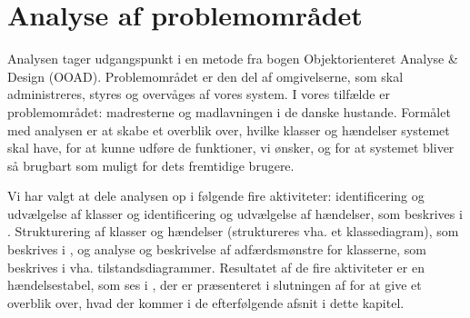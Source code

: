 \chapter{Analyse af problemområdet}
\label{chap:analyseafpo}

Analysen tager udgangspunkt i en metode fra bogen Objektorienteret Analyse \& Design (OOAD)\cite[s. ~43]{ooad}. Problemområdet er den del af omgivelserne, som skal administreres, styres og overvåges af vores system. I vores tilfælde er problemområdet: madresterne og madlavningen i de danske hustande. Formålet med analysen er at skabe et overblik over, hvilke klasser og hændelser systemet skal have, for at kunne udføre de funktioner, vi ønsker, og for at systemet bliver så brugbart som muligt for dets fremtidige brugere. 

Vi har valgt at dele analysen op i følgende fire aktiviteter: identificering og udvælgelse af klasser og identificering og udvælgelse af hændelser, som beskrives i . Strukturering af klasser og hændelser (struktureres vha. et klassediagram), som beskrives i , og analyse og beskrivelse af adfærdsmønstre for klasserne, som beskrives i  vha. tilstandsdiagrammer. Resultatet af de fire aktiviteter er en hændelsestabel, som ses i , der er præsenteret i slutningen af  for at give et overblik over, hvad der kommer i de efterfølgende afsnit i dette kapitel.


 
            
 
       

